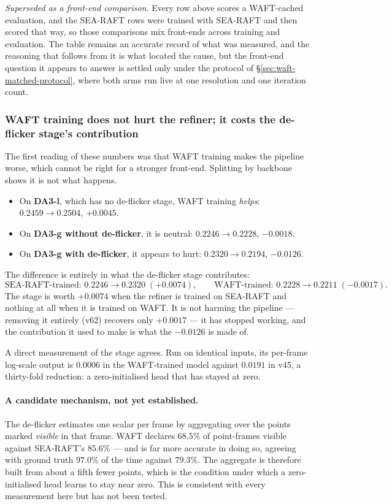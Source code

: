 \documentclass[11pt,a4paper]{article}
\begin{document}
\noindent\emph{Superseded as a front-end comparison.} Every row above scores a WAFT-cached
evaluation, and the SEA-RAFT rows were trained with SEA-RAFT and then scored that way, so those
comparisons mix front-ends across training and evaluation. The table remains an accurate record of
what was measured, and the reasoning that follows from it is what located the cause, but the
front-end question it appears to answer is settled only under the protocol of
\S\ref{sec:waft-matched-protocol}, where both arms run live at one resolution and one iteration
count.

\subsubsection{WAFT training does not hurt the refiner; it costs the de-flicker stage's contribution}
\label{sec:waft-deflicker-silent}

The first reading of these numbers was that WAFT training makes the pipeline worse, which cannot be
right for a stronger front-end. Splitting by backbone shows it is not what happens.

\begin{itemize}
  \item On \textbf{DA3-l}, which has no de-flicker stage, WAFT training \emph{helps}:
    $0.2459\to0.2504$, $+0.0045$.
  \item On \textbf{DA3-g without de-flicker}, it is neutral: $0.2246\to0.2228$, $-0.0018$.
  \item On \textbf{DA3-g with de-flicker}, it appears to hurt: $0.2320\to0.2194$, $-0.0126$.
\end{itemize}

\noindent The difference is entirely in what the de-flicker stage contributes:
%
\[
  \text{SEA-RAFT-trained: } 0.2246 \to 0.2320 \;(+0.0074), \qquad
  \text{WAFT-trained: } 0.2228 \to 0.2211 \;(-0.0017).
\]
%
The stage is worth $+0.0074$ when the refiner is trained on SEA-RAFT and nothing at all when it is
trained on WAFT. It is not harming the pipeline --- removing it entirely (v62) recovers only
$+0.0017$ --- it has stopped working, and the contribution it used to make is what the $-0.0126$ is
made of.

A direct measurement of the stage agrees. Run on identical inputs, its per-frame log-scale output is
$0.0006$ in the WAFT-trained model against $0.0191$ in v45, a thirty-fold reduction: a zero-initialised
head that has stayed at zero.

\paragraph{A candidate mechanism, not yet established.} The de-flicker estimates one scalar per frame
by aggregating over the points marked \emph{visible} in that frame. WAFT declares $68.5\%$ of
point-frames visible against SEA-RAFT's $85.6\%$ --- and is far more accurate in doing so, agreeing
with ground truth $97.0\%$ of the time against $79.3\%$. The aggregate is therefore built from about
a fifth fewer points, which is the condition under which a zero-initialised head learns to stay near
zero. This is consistent with every measurement here but has not been tested.
\end{document}
